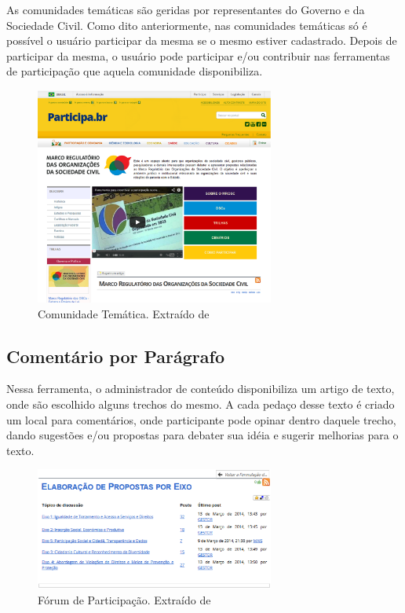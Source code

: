 %

As comunidades temáticas são geridas por representantes do Governo e da Sociedade Civil. Como dito anteriormente, nas comunidades temáticas só é possível o usuário participar da mesma se o mesmo estiver cadastrado. Depois de participar da mesma, o usuário pode participar e/ou contribuir nas ferramentas de participação que aquela comunidade disponibiliza.

\graphicspath{{figuras/}}
\begin{figure}[H]
\centering
\includegraphics[width=0.7\textwidth]{comunidades-tematicas}
\caption{Comunidade Temática. Extraído de}
\label{fig:comunidadestematicas}
\end{figure}


\subsection*{Comentário por Parágrafo}

Nessa ferramenta, o administrador de conteúdo disponibiliza um artigo de texto, onde são escolhido alguns trechos do mesmo. A cada pedaço desse texto é criado um local para comentários, onde participante pode opinar dentro daquele trecho, dando sugestões e/ou propostas para debater sua idéia e sugerir melhorias para o texto.

\graphicspath{{figuras/}}
\begin{figure}[H]
\centering
\includegraphics[width=0.7\textwidth]{foruns-participacao}
\caption{Fórum de Participação. Extraído de}
\label{fig:forumsparticipacao}
\end{figure}


